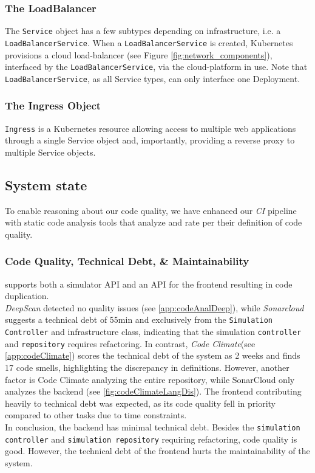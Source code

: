 \subsubsection{The LoadBalancer}
The \texttt{Service} object has a few subtypes depending on infrastructure, i.e. a \texttt{LoadBalancerService}.
When a \texttt{LoadBalancerService} is created, Kubernetes provisions a cloud load-balancer (see Figure \ref{fig:network_components}), interfaced by the \texttt{LoadBalancerService}, via the cloud-platform in use. Note that \texttt{LoadBalancerService}, as all Service types, can only interface one Deployment.

\subsubsection{The Ingress Object}
\texttt{Ingress} is a Kubernetes resource allowing access to multiple web applications through a single Service object \cite{k8sbook} and, importantly, providing a reverse proxy to multiple Service objects.

\subsection{System state}
\label{subsec:system_state}
To enable reasoning about our code quality, we have enhanced our \textit{CI} pipeline with static code analysis tools that analyze and rate \mini per their definition of code quality.

\subsubsection{Code Quality, Technical Debt, \& Maintainability}
\label{subsubsec:code_quality}
\mini supports both a simulator API and an API for the frontend resulting in code duplication.\\
\textit{DeepScan} detected no quality issues (see \ref{app:codeAnalDeep}), while \textit{Sonarcloud} suggests a technical debt of 55min and exclusively from the \texttt{Simulation Controller} and infrastructure class, indicating that the simulation \texttt{controller} and \texttt{repository} requires refactoring. In contrast, \textit{Code Climate}(see \ref{app:codeClimate}) scores the technical debt of the system as 2 weeks and finds 17 code smells, highlighting the discrepancy in definitions. However, another factor is Code Climate analyzing the entire repository, while SonarCloud only analyzes the backend (see \ref{fig:codeClimateLangDis}). The frontend contributing heavily to technical debt was expected, as its code quality fell in priority compared to other tasks due to time constraints.  \\
In conclusion, the backend has minimal technical debt. Besides the \texttt{simulation controller} and \texttt{simulation repository} requiring refactoring, code quality is good. However, the technical debt of the frontend hurts the maintainability of the system.

